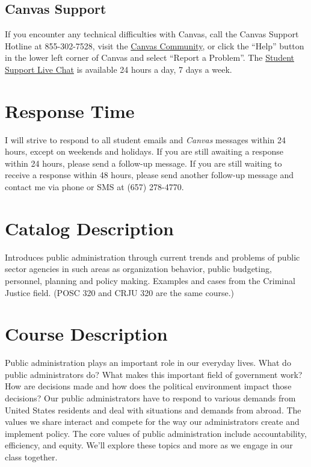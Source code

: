 \documentclass[11pt, letterpaper]{article}
\begin{document}
\subsection*{Canvas Support}

If you encounter any technical difficulties with Canvas, call the Canvas Support Hotline at 855-302-7528, visit the \href{https://community.canvaslms.com/docs/DOC-10720-67952720329}{Canvas Community}, or click the ``Help'' button in the lower left corner of Canvas and select ``Report a Problem''. The \href{https://cases.canvaslms.com/liveagentchat?chattype=student&sfid=001A000000YzcwQIAR}{Student Support Live Chat} is available 24 hours a day, 7 days a week.

\section*{Response Time} I will strive to respond to all student emails and \emph{Canvas} messages within 24 hours, except on weekends and holidays. If you are still awaiting a response within 24 hours, please send a follow-up message. If you are still waiting to receive a response within 48 hours, please send another follow-up message and contact me via phone or SMS at (657) 278-4770.

\section*{Catalog Description}

Introduces public administration through current trends and problems of public sector agencies in such areas as organization behavior, public budgeting, personnel, planning and policy making. Examples and cases from the Criminal Justice field. (POSC 320 and CRJU 320 are the same course.)

\section*{Course Description}

Public administration plays an important role in our everyday lives. What do public administrators do? What makes this important field of government work? How are decisions made and how does the political environment impact those decisions? Our public administrators have to respond to various demands from United States residents and deal with situations and demands from abroad. The values we share interact and compete for the way our administrators create and implement policy. The core values of public administration include accountability, efficiency, and equity. We'll explore these topics and more as we engage in our class together. 
\end{document}
